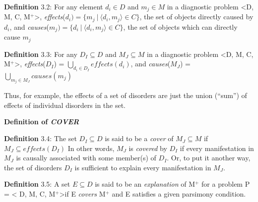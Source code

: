 \documentclass{article}
\begin{document}
\par 
\textbf{Definition} 3.2: For any element $d_i \in D$ and $m_j \in M$ in a
diagnostic problem \textless D, M, C, M$^{+}$\textgreater,
\textit{effects}($d_i) = \{ m_j\:|\:\langle d_i, m_j\rangle \in C\}$, the set
of objects directly caused by $d_i$, and 
\textit{causes}($m_j) = \{ d_i\:|\:\langle d_i, m_j\rangle \in C\}$, the set of
objects which can directly cause $m_j$
\newline


\par 
\textbf{Definition} 3.3: For any $D_I \subseteq D$ and $M_J \subseteq M$ in a
diagnostic problem \textless D, M, C, M$^{+}$\textgreater,
\textit{effects}($D_I$) = $\bigcup\limits_{d_i \in D_I} effects(d_i)$, and
\textit{causes}($M_J$) = $\bigcup\limits_{m_j \in M_J} causes(m_j)$
\newline
\par 
Thus, for example, the effects of a set of disorders are just the union
(``sum'') of effects of individual disorders in the set.
\newline


\textbf{Definition of \textit{COVER}}
\newline
\par 
\textbf{Definition} 3.4: The set $D_I \subseteq D$ is said to be a
\textit{cover} of $M_J \subseteq M$ if $M_J \subseteq effects(D_I)$
\newline
In other words, $M_J$ is \textit{covered} by $D_I$ if every manifestation in
$M_J$ is causally associated with some member(s) of $D_I$.  Or, to put it
another way, the set of disorders $D_I$ is sufficient to explain every 
manifestation in $M_J$.


\par 
\textbf{Definition} 3.5: A set $E \subseteq D$ is said to be an
\textit{explanation} of M$^{+}$ for a problem P = \textless
D, M, C, M$^{+}$\textgreater if E \textit{covers} M$^{+}$ and E satisfies a
given parsimony condition.
\newline
\end{document}
